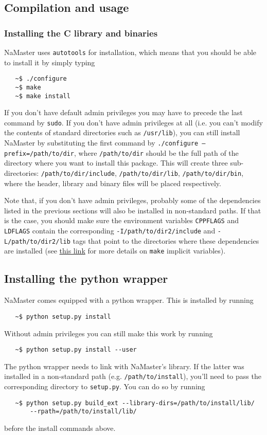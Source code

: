 \documentclass[a4paper,10pt]{article}
\begin{document}
\subsection{Compilation and usage}\label{ssec:compile}
\subsubsection*{Installing the C library and binaries}
NaMaster uses {\tt autotools} for installation, which means that you should be able to install it by simply typing
\begin{verbatim}
   ~$ ./configure
   ~$ make
   ~$ make install
\end{verbatim}
If you don't have default admin privileges you may have to precede the last command by {\tt sudo}. If you don't have admin privileges at all (i.e. you can't modify the contents of standard directories such as {\tt /usr/lib}), you can still install NaMaster by substituting the first command by {\tt ./configure --prefix=/path/to/dir}, where {\tt /path/to/dir} should be the full path of the directory where you want to install this package. This will create three sub-directories: {\tt /path/to/dir/include}, {\tt /path/to/dir/lib}, {\tt /path/to/dir/bin}, where the header, library and binary files will be placed respectively.

Note that, if you don't have admin privileges, probably some of the dependencies listed in the previous sections will also be installed in non-standard paths. If that is the case, you should make sure the environment variables {\tt CPPFLAGS} and {\tt LDFLAGS} contain the corresponding {\tt -I/path/to/dir2/include} and {\tt -L/path/to/dir2/lib} tags that point to the directories where these dependencies are installed (see \href{https://www.gnu.org/software/make/manual/html_node/Implicit-Variables.html}{this link} for more details on {\tt make} implicit variables).

\subsection*{Installing the python wrapper}
NaMaster comes equipped with a python wrapper. This is installed by running
\begin{verbatim}
   ~$ python setup.py install
\end{verbatim}
Without admin privileges you can still make this work by running
\begin{verbatim}
   ~$ python setup.py install --user
\end{verbatim}
The python wrapper needs to link with NaMaster's library. If the latter was installed in a non-standard path (e.g. {\tt /path/to/install}), you'll need to pass the corresponding directory to {\tt setup.py}. You can do so by running
\begin{verbatim}
   ~$ python setup.py build_ext --library-dirs=/path/to/install/lib/
       --rpath=/path/to/install/lib/
\end{verbatim}
before the install commands above.
\end{document}
